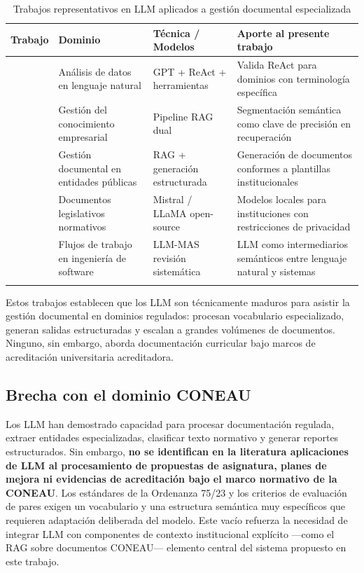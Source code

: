 \begin{table}[H]
\centering
\small
\setlength{\extrarowheight}{3pt}
\caption{Trabajos representativos en LLM aplicados a gestión documental especializada}
\label{tab:llm_doc_comparativa}
\begin{tabularx}{\textwidth}{p{2.8cm} p{2.6cm} p{2.8cm} X}
\toprule
\textbf{Trabajo} & \textbf{Dominio} & \textbf{Técnica / Modelos} & \textbf{Aporte al presente trabajo} \\
\midrule
\citet{garcia2025desarrollo}
  & Análisis de datos en lenguaje natural
  & GPT + ReAct + herramientas
  & Valida ReAct para dominios con terminología específica \\
\arrayrulecolor{gray!35}\hline
\citet{farsane2025automatizacion}
  & Gestión del conocimiento empresarial
  & Pipeline RAG dual
  & Segmentación semántica como clave de precisión en recuperación \\
\hline
\citet{collado2024implementacion}
  & Gestión documental en entidades públicas
  & RAG + generación estructurada
  & Generación de documentos conformes a plantillas institucionales \\
\hline
\citet{torres2024desarrollo}
  & Documentos legislativos normativos
  & Mistral / LLaMA \mbox{open-source}
  & Modelos locales para instituciones con restricciones de privacidad \\
\hline
\citet{he2025llm}
  & Flujos de trabajo en ingeniería de software
  & LLM-MAS revisión sistemática
  & LLM como intermediarios semánticos entre lenguaje natural y sistemas \\
\arrayrulecolor{black}\bottomrule
\end{tabularx}
\end{table}

Estos trabajos establecen que los LLM son técnicamente maduros para asistir la gestión documental en dominios regulados: procesan vocabulario especializado, generan salidas estructuradas y escalan a grandes volúmenes de documentos. Ninguno, sin embargo, aborda documentación curricular bajo marcos de acreditación universitaria acreditadora.

\subsection{Brecha con el dominio CONEAU}

Los LLM han demostrado capacidad para procesar documentación regulada, extraer entidades especializadas, clasificar texto normativo y generar reportes estructurados. Sin embargo, \textbf{no se identifican en la literatura aplicaciones de LLM al procesamiento de propuestas de asignatura, planes de mejora ni evidencias de acreditación bajo el marco normativo de la CONEAU}. Los estándares de la Ordenanza 75/23 y los criterios de evaluación de pares exigen un vocabulario y una estructura semántica muy específicos que requieren adaptación deliberada del modelo. Este vacío refuerza la necesidad de integrar LLM con componentes de contexto institucional explícito ---como el RAG sobre documentos CONEAU--- elemento central del sistema propuesto en este trabajo.

